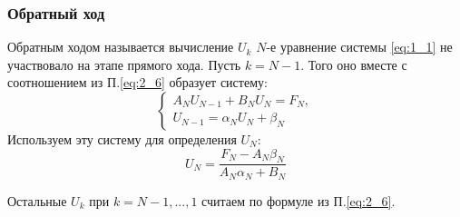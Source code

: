 \subsubsection{Обратный ход}
Обратным ходом называется вычисление \(U_k\)
\(N\)-е уравнение системы \ref{eq:1_1} не участвовало на этапе прямого хода.
Пусть \(k=N-1\). Того оно вместе с соотношением из П.\ref{eq:2_6} образует систему:
\[
  \begin{cases}
    A_N U_{N-1} + B_N U_N = F_N,
    \\
    U_{N-1}=\alpha_N U_N + \beta_N
  \end{cases}
\]
Используем эту систему для определения \(U_N\):
\[U_N = \frac{F_N-A_N\beta_N}{A_N\alpha_N+B_N}\]

Остальные \(U_k\) при \(k=N-1,...,1\) считаем по формуле из П.\ref{eq:2_6}.
